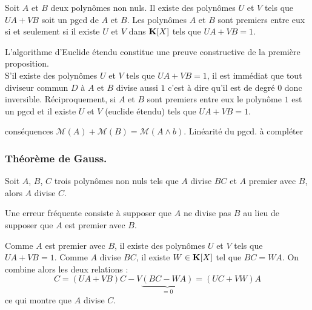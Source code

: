 \begin{thm}[de Bezout]
 Soit $A$ et $B$ deux polynômes non nuls. Il existe des polynômes $U$ et $V$ tels que $UA + VB$ soit un pgcd de $A$ et $B$.\newline 
 Les polynômes $A$ et $B$ sont premiers entre eux si et seulement si il existe $U$ et $V$ dans $\mathbf{K}[X]$ tels que $UA + VB = 1$.
\end{thm}
\begin{demo}
 L'algorithme d'Euclide étendu constitue une preuve constructive de la première proposition.\\
 S'il existe des polynômes $U$ et $V$ tels que $UA + VB = 1$, il est immédiat que tout diviseur commun $D$ à $A$ et $B$ divise aussi $1$ c'est à dire qu'il est de degré $0$ donc inversible. Réciproquement, si $A$ et $B$ sont premiers entre eux le polynôme $1$ est un pgcd et il existe $U$ et $V$ (euclide étendu) tels que $UA + VB = 1$. 
\end{demo}
conséquences
$\mathcal{M}(A) + \mathcal{M}(B) = \mathcal{M}(A\wedge b)$. Linéarité du pgcd. à compléter

\subsubsection{Théorème de Gauss.}
\begin{thm}[de Gauss]
 Soit $A$, $B$, $C$ trois polynômes non nuls tels que $A$ divise $BC$ et $A$ premier avec $B$, alors $A$ divise $C$.
\end{thm}
\begin{rem}
 Une erreur fréquente consiste à supposer que $A$ ne divise pas $B$ au lieu de supposer que $A$ est premier avec $B$.
\end{rem}
\begin{demo}
 Comme $A$ est premier avec $B$, il existe des polynômes $U$ et $V$ tels que $U A + V B = 1$. Comme $A$ divise $BC$, il existe $W\in\mathbf{K}[X]$ tel que $BC = WA$. On combine alors les deux relations :
\begin{displaymath}
 C =(U A + V B)C - V\underset{=0}{\underbrace{(BC - WA)}} = (UC + V W)A
\end{displaymath}
ce qui montre que $A$ divise $C$.
\end{demo}


